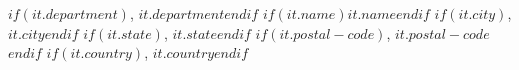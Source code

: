$if(it.department)$, $it.department$$endif$%
$if(it.name)$$it.name$$endif$%
$if(it.city)$, $it.city$$endif$%
$if(it.state)$, $it.state$$endif$%
$if(it.postal-code)$, $it.postal-code$$endif$%
$if(it.country)$, $it.country$$endif$

